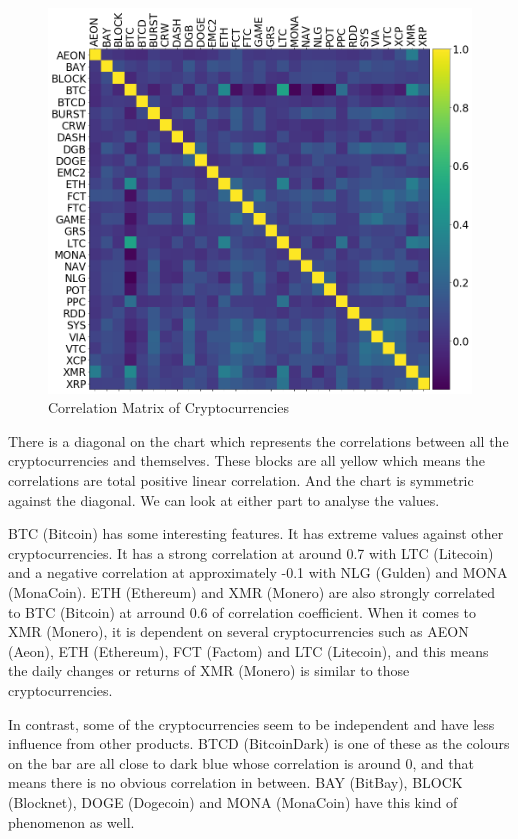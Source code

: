 \documentclass[11pt]{article} %
\theoremstyle{plain}
\theoremstyle{definition}
\begin{document}
\begin{figure}[ht]
    \includegraphics[width=1\linewidth, center]{resources/crypto_corr.png}
    \caption{Correlation Matrix of Cryptocurrencies}
    \label{fig:cryptocorr}
\end{figure}

There is a diagonal on the chart which represents the correlations between all the cryptocurrencies and themselves. These blocks are all yellow which means the correlations are total positive linear correlation. And the chart is symmetric against the diagonal. We can look at either part to analyse the values.

BTC (Bitcoin) has some interesting features. It has extreme values against other cryptocurrencies. It has a strong correlation at around 0.7 with LTC (Litecoin) and a negative correlation at approximately -0.1 with NLG (Gulden) and MONA (MonaCoin). ETH (Ethereum) and XMR (Monero) are also strongly correlated to BTC (Bitcoin) at arround 0.6 of correlation coefficient. When it comes to XMR (Monero), it is dependent on several cryptocurrencies such as AEON (Aeon), ETH (Ethereum), FCT (Factom) and LTC (Litecoin), and this means the daily changes or returns of XMR (Monero) is similar to those cryptocurrencies.

In contrast, some of the cryptocurrencies seem to be independent and have less influence from other products. BTCD (BitcoinDark) is one of these as the colours on the bar are all close to dark blue whose correlation is around 0, and that means there is no obvious correlation in between. BAY (BitBay), BLOCK (Blocknet), DOGE (Dogecoin) and MONA (MonaCoin) have this kind of phenomenon as well.
\end{document}
